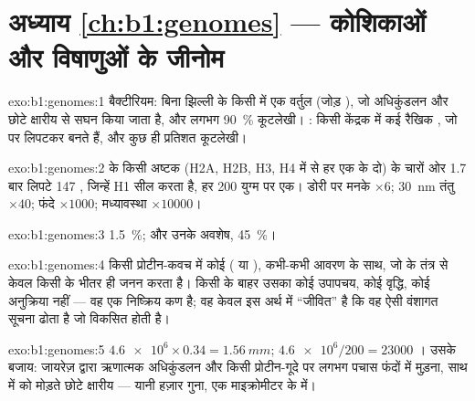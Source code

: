 \section*{अध्याय \ref{ch:b1:genomes} --- कोशिकाओं और विषाणुओं के जीनोम}

\begin{solution}{exo:b1:genomes:1}
बैक्टीरियम: बिना झिल्ली के किसी  में एक वर्तुल 
(जोड़ ), जो अधिकुंडलन और छोटे क्षारीय  से सघन किया
जाता है, और लगभग \qty{90}{\%} कूटलेखी। : किसी केंद्रक में कई
रैखिक , जो  पर लिपटकर  बनते हैं, और कुछ ही
प्रतिशत कूटलेखी।
\end{solution}

\begin{solution}{exo:b1:genomes:2}
 के किसी अष्टक (H2A, H2B, H3, H4 में से हर एक के दो) के चारों
ओर 1.7 बार लिपटे 147 , जिन्हें H1 सील करता है, हर 200 युग्म
पर एक। डोरी पर मनके $\times 6$; \qty{30}{nm} तंतु $\times 40$; फंदे $\times 1000$;
मध्यावस्था  $\times \num{10000}$।
\end{solution}

\begin{solution}{exo:b1:genomes:3}
\qty{1.5}{\%};  और उनके अवशेष, \qty{45}{\%}।
\end{solution}

\begin{solution}{exo:b1:genomes:4}
किसी प्रोटीन-कवच में कोई  ( या ), कभी-कभी आवरण के साथ, जो
 के तंत्र से केवल किसी  के भीतर ही जनन करता है। किसी 
के बाहर उसका कोई उपापचय, कोई वृद्धि, कोई अनुक्रिया नहीं --- वह एक निष्क्रिय
कण है; वह केवल इस अर्थ में ``जीवित'' है कि वह ऐसी वंशागत सूचना ढोता है जो
विकसित होती है।
\end{solution}

\begin{solution}{exo:b1:genomes:5}
$\num{4.6e6}\times 0.34 = \qty{1.56}{mm}$; $\num{4.6e6}/200 = \num{23000}$
। उसके बजाय: जायरेज़ द्वारा ऋणात्मक अधिकुंडलन और किसी
प्रोटीन-गूदे पर लगभग पचास फंदों में मुड़ना, साथ में  को मोड़ते छोटे
क्षारीय  --- यानी हज़ार गुना, एक माइक्रोमीटर के  में।
\end{solution}

